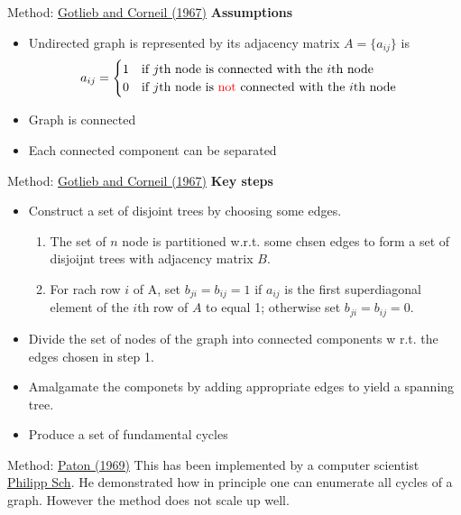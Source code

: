 \documentclass[xcolor=dvipsnames]{beamer}
\begin{document}
\begin{frame}{Method: \href{https://dl.acm.org/doi/pdf/10.1145/363848.363861}{Gotlieb and Corneil (1967)}}
	\textbf{Assumptions}
	\begin{itemize}
		\item Undirected graph is represented by its adjacency matrix $A=\{a_{ij}\}$ is
	\begin{align*}
		a_{ij} &= 
		\begin{cases}
			1 & \mbox{if $j$th node is connected with the $i$th node}\\
			0& \mbox{if $j$th node is {\color{red}not} connected with the $i$th node}\\
		\end{cases}
	\end{align*}

	\item Graph is connected
	\item Each connected component can be separated
	\end{itemize}
\end{frame}

\begin{frame}{Method: \href{https://dl.acm.org/doi/pdf/10.1145/363848.363861}{Gotlieb and Corneil (1967)}}
	\textbf{Key steps}
	\begin{itemize}
		\item Construct a set of disjoint trees by choosing some edges. 

		\begin{enumerate}
			\item The set of $n$ node is partitioned w.r.t. some chsen edges to form a set of disjoijnt trees with adjacency matrix $B$.
			\item For rach row $i$ of A, set $b_{ji}=b_{ij}=1$ if $a_{ij}$ is the first superdiagonal element of the $i$th row of $A$ to equal 1; otherwise set $b_{ji}=b_{ij}=0$.
		\end{enumerate}

	\item Divide the set of nodes of the graph into connected components w r.t. the edges chosen in step 1.
	\item Amalgamate the componets by adding appropriate edges to yield a spanning tree.
	\item Produce a set of fundamental cycles
	\end{itemize}
\end{frame}
\begin{frame}{Method: \href{http://www.cs.kent.edu/~dragan/GraphAn/CycleBasis/p514-paton.pdf}{Paton (1969)}}
	This has been implemented by a computer scientist \href{https://www.codeproject.com/Articles/1158232/Enumerating-All-Cycles-in-an-Undirected-Graph}{Philipp Sch}. He demonstrated how in principle one can enumerate all cycles of a graph. However the method does not scale up well.
\end{frame}
\end{document}

